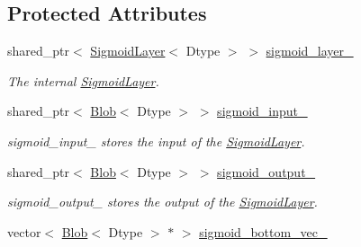 \subsection*{Protected Attributes}
\begin{DoxyCompactItemize}
\item 
shared\+\_\+ptr$<$ \hyperlink{classcaffe_1_1SigmoidLayer}{Sigmoid\+Layer}$<$ Dtype $>$ $>$ \hyperlink{classcaffe_1_1SwishLayer_a6935dac80459c96eccd8916eae8762b4}{sigmoid\+\_\+layer\+\_\+}\hypertarget{classcaffe_1_1SwishLayer_a6935dac80459c96eccd8916eae8762b4}{}\label{classcaffe_1_1SwishLayer_a6935dac80459c96eccd8916eae8762b4}

\begin{DoxyCompactList}\small\item\em The internal \hyperlink{classcaffe_1_1SigmoidLayer}{Sigmoid\+Layer}. \end{DoxyCompactList}\item 
shared\+\_\+ptr$<$ \hyperlink{classcaffe_1_1Blob}{Blob}$<$ Dtype $>$ $>$ \hyperlink{classcaffe_1_1SwishLayer_a6b1063f59cffc8262c89928d04f75224}{sigmoid\+\_\+input\+\_\+}\hypertarget{classcaffe_1_1SwishLayer_a6b1063f59cffc8262c89928d04f75224}{}\label{classcaffe_1_1SwishLayer_a6b1063f59cffc8262c89928d04f75224}

\begin{DoxyCompactList}\small\item\em sigmoid\+\_\+input\+\_\+ stores the input of the \hyperlink{classcaffe_1_1SigmoidLayer}{Sigmoid\+Layer}. \end{DoxyCompactList}\item 
shared\+\_\+ptr$<$ \hyperlink{classcaffe_1_1Blob}{Blob}$<$ Dtype $>$ $>$ \hyperlink{classcaffe_1_1SwishLayer_a5fdfed8eb4ee88f52d460ddd02e728e2}{sigmoid\+\_\+output\+\_\+}\hypertarget{classcaffe_1_1SwishLayer_a5fdfed8eb4ee88f52d460ddd02e728e2}{}\label{classcaffe_1_1SwishLayer_a5fdfed8eb4ee88f52d460ddd02e728e2}

\begin{DoxyCompactList}\small\item\em sigmoid\+\_\+output\+\_\+ stores the output of the \hyperlink{classcaffe_1_1SigmoidLayer}{Sigmoid\+Layer}. \end{DoxyCompactList}\item 
vector$<$ \hyperlink{classcaffe_1_1Blob}{Blob}$<$ Dtype $>$ $\ast$ $>$ \hyperlink{classcaffe_1_1SwishLayer_a8a1e381a418c6ff8653c26e4e9f9704e}{sigmoid\+\_\+bottom\+\_\+vec\+\_\+}\hypertarget{classcaffe_1_1SwishLayer_a8a1e381a418c6ff8653c26e4e9f9704e}{}\label{classcaffe_1_1SwishLayer_a8a1e381a418c6ff8653c26e4e9f9704e}


\end{DoxyCompactItemize}
